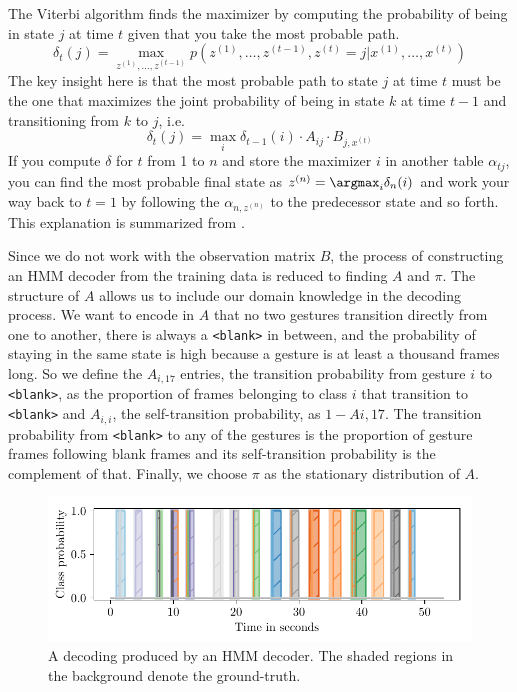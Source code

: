 The Viterbi algorithm finds the maximizer by computing the probability of being
in state $j$ at time $t$ given that you take the most probable path.
\begin{equation*}
  \delta_{t}(j) = \max_{z^{(1)}, \dots, z^{(t - 1)}} p(z^{(1)}, \dots, z^{(t - 1)}, z^{(t)} = j | x^{(1)}, \dots, x^{(t)})
\end{equation*}
The key insight here is that the most probable path to state $j$ at time $t$
must be the one that maximizes the joint probability of being in state $k$ at
time $t - 1$ and transitioning from $k$ to $j$, i.e.
\begin{equation*}
  \delta_{t}(j) = \max_{i} \delta_{t - 1}(i) \cdot A_{ij} \cdot B_{j,x^{(t)}}
\end{equation*}
If you compute $\delta$ for $t$ from 1 to $n$ and store the maximizer $i$ in
another table $\alpha_{tj}$, you can find the most probable final state as
$z^{(n)} = \argmax_{i} \delta_{n}(i)$ and work your way back to $t = 1$ by
following the $\alpha_{n,z^{(n)}}$ to the predecessor state and so forth.
This explanation is summarized from \cite{murphy12}.

Since we do not work with the observation matrix $B$, the process of
constructing an HMM decoder from the training data is reduced to finding $A$ and
$\pi$. The structure of $A$ allows us to include our domain knowledge in the
decoding process. We want to encode in $A$ that no two gestures transition
directly from one to another, there is always a \texttt{<blank>} in between, and
the probability of staying in the same state is high because a gesture is at
least a thousand frames long. So we define the $A_{i,17}$ entries, the
transition probability from gesture $i$ to \texttt{<blank>}, as the proportion
of frames belonging to class $i$ that transition to \texttt{<blank>} and
$A_{i,i}$, the self-transition probability, as $1 - A{i,17}$. The transition
probability from \texttt{<blank>} to any of the gestures is the proportion of
gesture frames following blank frames and its self-transition probability is the
complement of that. Finally, we choose $\pi$ as the stationary distribution of
$A$.

\begin{figure}
  \centering
  \includegraphics{figures/methods/decoded}
  \caption{A decoding produced by an HMM decoder. The shaded regions in the
    background denote the ground-truth.}
  \label{fig:decoded}
\end{figure}

